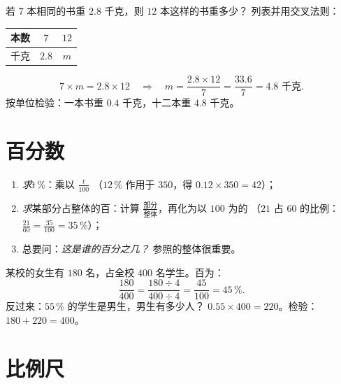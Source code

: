 \begin{example}[求第四个比例项]\label{ex:g7:prop:fourth}
若 $7$ 本相同的书重 $2.8$ 千克，则 $12$ 本这样的书重多少？
列表并用交叉法则：
\begin{center}
\renewcommand{\arraystretch}{1.3}
\begin{tabular}{l|cc}
本数 & $7$ & $12$ \\
\hline
千克 & $2.8$ & $m$ \\
\end{tabular}
\end{center}
\[
7 \times m = 2.8 \times 12
\quad\Longrightarrow\quad
m = \frac{2.8 \times 12}{7} = \frac{33.6}{7} = 4.8 \text{ 千克}.
\]
按单位检验：一本书重 $0.4$ 千克，十二本重 $4.8$ 千克。
\end{example}

\section{百分数}

\begin{method}[百分数的应用与求法]\label{met:g7:prop:percent}
\begin{enumerate}
  \item \emph{求}$t\,\%$：乘以 $\frac{t}{100}$
        （$12\,\%$ 作用于 $350$，得 $0.12 \times 350 = 42$）；
  \item \emph{求}某部分占整体的百：计算
        $\frac{\text{部分}}{\text{整体}}$，再化为以 $100$ 为的
        （$21$ 占 $60$ 的比例：$\frac{21}{60} = \frac{35}{100} = 35\,\%$）；
  \item 总要问：\emph{这是谁的百分之几？}
        参照的整体很重要。
\end{enumerate}
\end{method}

\begin{example}\label{ex:g7:prop:percent}
某校的女生有 $180$ 名，占全校 $400$ 名学生。百为：
\[
\frac{180}{400} = \frac{180 \div 4}{400 \div 4} = \frac{45}{100}
= 45\,\% .
\]
反过来：$55\,\%$ 的学生是男生，男生有多少人？
$0.55 \times 400 = 220$。检验：$180 + 220 = 400$。
\end{example}

\section{比例尺}

